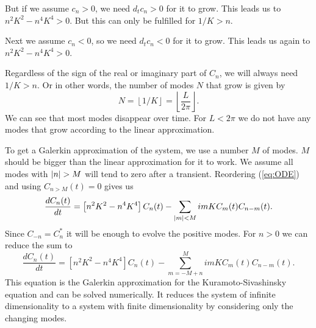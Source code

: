 But if we assume $c_n > 0$, we need $d_t c_n > 0$ for it to grow. This leads us to $n^2 K^2 - n^4 K^4 > 0$. But this can only be fulfilled for $1/K > n$.

Next we assume $c_n < 0$, so we need $d_t c_n < 0$ for it to grow. This leads us again to $n^2 K^2 - n^4 K^4 > 0$.

Regardless of the sign of the real or imaginary part of $C_n$, we will always need $1/K > n$. Or in other words, the number of modes $N$ that grow is given by
\begin{equation}
  N = \left \lfloor{1/K}\right \rfloor = \left \lfloor{\frac{L}{2\pi}}\right \rfloor.
\end{equation}
We can see that most modes disappear over time. For $L < 2 \pi$ we do not have any modes that grow according to the linear approximation.

To get a Galerkin approximation of the system, we use a number $M$ of modes. $M$ should be bigger than the linear approximation for it to work. We assume all modes with $\left\vert n \right\vert > M$ will tend to zero after a transient. Reordering (\ref{eq:ODE}) and using $C_{n > M}(t) = 0$ gives us
\begin{equation}
    \frac{d C_n(t)}{dt} = \left[ n^2 K^2 - n^4 K^4 \right] C_n(t) - \sum_{\left\vert m \right\vert < M} i m K C_m(t) C_{n - m}(t).
\end{equation}
Since $C_{-n} = C_n^*$ it will be enough to evolve the positive modes. For $n > 0$ we can reduce the sum to
\begin{equation}
  \frac{d C_n(t)}{dt} = \left[ n^2 K^2 - n^4 K^4 \right] C_n(t) - \sum_{m = -M + n}^{M} i m K C_m(t) C_{n - m}(t). \label{eq:galerkin}
\end{equation}
This equation is the Galerkin approximation for the Kuramoto-Sivashinsky equation and can be solved numerically. It reduces the system of infinite dimensionality to a system with finite dimensionality by considering only the changing modes.
